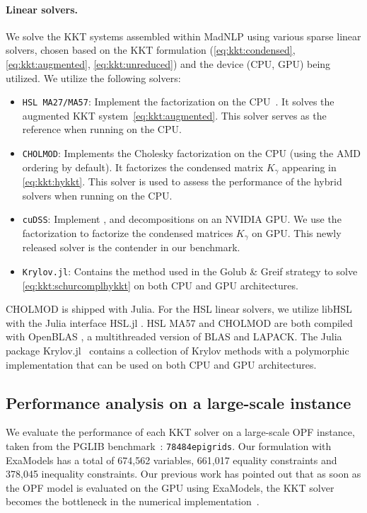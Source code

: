 \paragraph{Linear solvers.}
We solve the KKT systems assembled within MadNLP using various sparse linear solvers, chosen based on the KKT formulation (\ref{eq:kkt:condensed}, \ref{eq:kkt:augmented}, \ref{eq:kkt:unreduced}) and the device (CPU, GPU) being utilized. We utilize the following solvers:
\begin{itemize}
  \item {\tt HSL MA27/MA57}: Implement the \lblt factorization on the CPU~\cite{duff1983multifrontal}.
    It solves the augmented KKT system~\eqref{eq:kkt:augmented}.
    This solver serves as the reference when running on the CPU.
  \item {\tt CHOLMOD}: Implements the Cholesky factorization on the CPU %
    (using the AMD ordering \cite{amestoy-david-duff-2004} by default).
    It factorizes the condensed matrix $K_\gamma$ appearing in \eqref{eq:kkt:hykkt}.
    This solver is used to assess the performance of the hybrid solvers when running on the CPU.
  \item {\tt cuDSS}: Implement \llt, \ldlt and \lu decompositions on an NVIDIA GPU.
    We use the \ldlt factorization to factorize the condensed matrices $K_\gamma$ on GPU.
    This newly released solver is the contender in our benchmark.
  \item {\tt Krylov.jl}: Contains the \CG method
    used in the Golub \& Greif strategy to solve \eqref{eq:kkt:schurcomplhykkt} on both CPU and GPU architectures.
\end{itemize}
CHOLMOD \cite{chen-davis-hager-rajamanickam-2008} is shipped with Julia.
For the HSL linear solvers, we utilize libHSL \cite{fowkes-lister-montoison-orban-2024} with the Julia interface HSL.jl \cite{montoison-orban-hsl-2021}.
HSL MA57 and CHOLMOD are both compiled with OpenBLAS \cite{openblas}, a multithreaded version of BLAS and LAPACK.
The Julia package Krylov.jl~\cite{montoison2023krylov} contains a collection of Krylov methods with a polymorphic implementation that can be used on both CPU and GPU architectures.

\subsection{Performance analysis on a large-scale instance}
\label{sec:num:pprof}
We evaluate the performance of each KKT solver on a large-scale OPF instance, taken from
the PGLIB benchmark~\cite{babaeinejadsarookolaee2019power}: {\tt 78484epigrids}.
Our formulation with ExaModels has
a total of 674,562 variables, 661,017 equality constraints and 378,045
inequality constraints.
Our previous work has pointed out that as soon as the OPF model is
evaluated on the GPU using ExaModels, the KKT solver becomes the bottleneck
in the numerical implementation~\cite{shin2023accelerating}.

